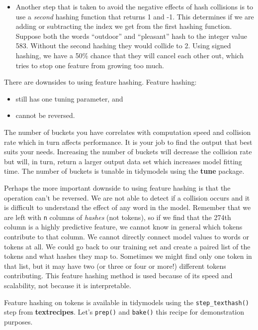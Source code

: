 \documentclass[
]{krantz}
\newenvironment{rmdblock}[1]
  {\begin{shaded*}
  \begin{itemize}[left = -1cm, labelsep = 1cm]
  \renewcommand{\labelitemi}{
    \raisebox{-.7\height}[0pt][0pt]{
      {\setkeys{Gin}{width=3em,keepaspectratio}\texttt{[image: images/\#1]}}
    }
  }
 
  \item
  }
  {
  \end{itemize}
  \end{shaded*}
  }
\newenvironment{rmdnote}
  {\begin{rmdblock}{note}}
  {\end{rmdblock}}
\begin{document}
\begin{rmdnote}
Another step that is taken to avoid the negative effects of hash
collisions is to use a \emph{second} hashing function that returns 1 and
-1. This determines if we are adding or subtracting the index we get
from the first hashing function. Suppose both the words ``outdoor'' and
``pleasant'' hash to the integer value 583. Without the second hashing
they would collide to 2. Using signed hashing, we have a 50\% chance
that they will cancel each other out, which tries to stop one feature
from growing too much.
\end{rmdnote}

There are downsides to using feature hashing. Feature hashing:

\begin{itemize}
\item
  still has one tuning parameter, and
\item
  cannot be reversed.
\end{itemize}

The number of buckets you have correlates with computation speed and collision rate which in turn affects performance.
It is your job to find the output that best suits your needs.
Increasing the number of buckets will decrease the collision rate but will, in turn, return a larger output data set which increases model fitting time.
The number of buckets is tunable in tidymodels using the \textbf{tune} package.

Perhaps the more important downside to using feature hashing is that the operation can't be reversed.
We are not able to detect if a collision occurs and it is difficult to understand the effect of any word in the model.
Remember that we are left with \texttt{n} columns of \emph{hashes} (not tokens), so if we find that the 274th column is a highly predictive feature, we cannot know in general which tokens contribute to that column.
We cannot directly connect model values to words or tokens at all.
We could go back to our training set and create a paired list of the tokens and what hashes they map to. Sometimes we might find only one token in that list, but it may have two (or three or four or more!) different tokens contributing.
This feature hashing method is used because of its speed and scalability, not because it is interpretable.

Feature hashing on tokens is available in tidymodels using the \texttt{step\_texthash()} step from \textbf{textrecipes}. Let's \texttt{prep()} and \texttt{bake()} this recipe for demonstration purposes.
\end{document}
